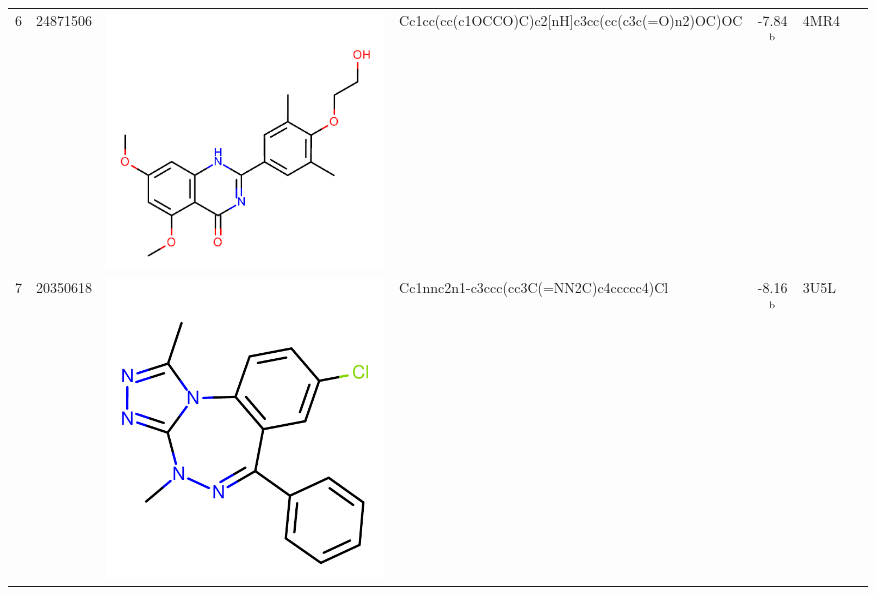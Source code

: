 \documentclass[aps,pre,twocolumn,nofootinbib,superscriptaddress,10pt, final,tightenlines]{revtex4-1}
\begin{document}
\begin{table}
\begin{center}
\begin{tabular}{llp{2cm}>{\ttfamily}lS[table-format=-1.2, table-figures-uncertainty=1]ll}
6        & 24871506                               & \parbox[c]{1em}{\includegraphics[scale=0.15]{figures/new-bromo/24871506.pdf}} & Cc1cc(cc(c1OCCO)C)c2[nH]c3cc(cc(c3c(=O)n2)OC)OC                  & -7.84$^{\rm b}$                               & 4MR4~\cite{Picaud:2013:PNAS}               & \cite{Picaud:2013:PNAS}                 \\ 
7        & 20350618                               & \parbox[c]{1em}{\includegraphics[scale=0.15]{figures/new-bromo/20350618.pdf}} & Cc1nnc2n1-c3ccc(cc3C(=NN2C)c4ccccc4)Cl                           & -8.16$^{\rm b}$                               & 3U5L~\cite{Fill:2012:Bioorg.Med.Chem.}     & \cite{Fill:2012:Bioorg.Med.Chem.}       \\ 

\end{tabular}
\end{center}
\end{table}
\end{document}
